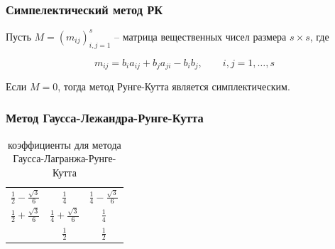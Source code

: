 \documentclass[t]{beamer}
\begin{document}
\begin{frame}
    \frametitle{Симпелектический метод РК}

    Пусть $M=\left( m_{ij} \right)^s_{i,j=1}$ -- матрица вещественных чисел размера
    $s\times s$, где
    \begin{block}{}
        \begin{equation*}
            m_{ij} = b_i a_{ij} + b_j a_{ji} - b_i b_j,\qquad i,j=1,\dots,s
        \end{equation*}
    \end{block}
    \begin{theorem}
        Если $M = 0$, тогда метод Рунге-Кутта является симплектическим.
    \end{theorem}
\end{frame}


\begin{frame}[c]
    \frametitle{Метод Гаусса-Лежандра-Рунге-Кутта}
    \begin{table}[h]
        \renewcommand{\arraystretch}{1.8}
        \centering
        \begin{tabular}{c|cc}
            $\frac12 - \frac{\sqrt3}6$ & $\frac14$                  & $\frac14 - \frac{\sqrt3}6$ \\
            $\frac12 + \frac{\sqrt3}6$ & $\frac14 + \frac{\sqrt3}6$ & $\frac14$ \\ \hline
                                       & $\frac12$                  & $\frac12$
        \end{tabular}
        \caption{коэффициенты для метода Гаусса-Лагранжа-Рунге-Кутта}
    \end{table}
\end{frame}
\end{document}
